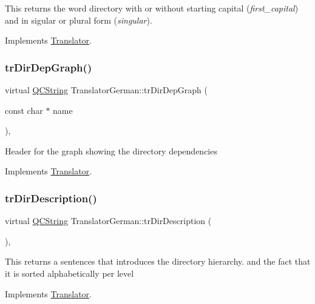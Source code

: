 This returns the word directory with or without starting capital ({\itshape first\+\_\+capital}) and in sigular or plural form ({\itshape singular}). 

Implements \mbox{\hyperlink{class_translator}{Translator}}.

\mbox{\label{class_translator_german_ae830a2c9591c04c380c62b5739804799}} 
\subsubsection{\texorpdfstring{trDirDepGraph()}{trDirDepGraph()}}
{\footnotesize\ttfamily virtual \mbox{\hyperlink{class_q_c_string}{Q\+C\+String}} Translator\+German\+::tr\+Dir\+Dep\+Graph (\begin{DoxyParamCaption}\item[{const char $\ast$}]{name }\end{DoxyParamCaption})\hspace{0.3cm}{\ttfamily [inline]}, {\ttfamily [virtual]}}

Header for the graph showing the directory dependencies 

Implements \mbox{\hyperlink{class_translator}{Translator}}.

\mbox{\label{class_translator_german_a33eef9cc312569c52faebe8c88a30973}} 
\subsubsection{\texorpdfstring{trDirDescription()}{trDirDescription()}}
{\footnotesize\ttfamily virtual \mbox{\hyperlink{class_q_c_string}{Q\+C\+String}} Translator\+German\+::tr\+Dir\+Description (\begin{DoxyParamCaption}{ }\end{DoxyParamCaption})\hspace{0.3cm}{\ttfamily [inline]}, {\ttfamily [virtual]}}

This returns a sentences that introduces the directory hierarchy. and the fact that it is sorted alphabetically per level 

Implements \mbox{\hyperlink{class_translator}{Translator}}.

